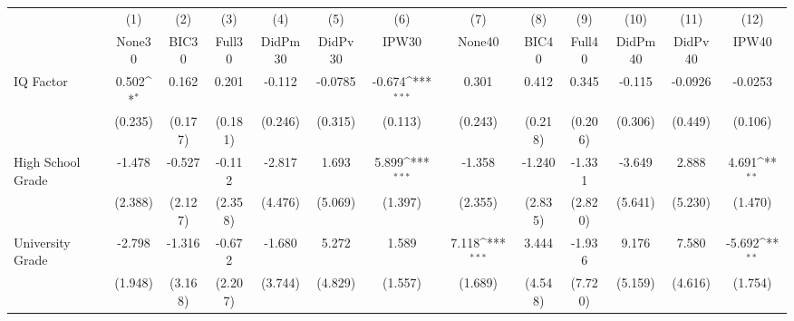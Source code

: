 {
\def\sym#1{\ifmmode^{#1}\else\(^{#1}\)\fi}
\begin{tabular}{l*{12}{c}}
\toprule
            &\multicolumn{1}{c}{(1)}&\multicolumn{1}{c}{(2)}&\multicolumn{1}{c}{(3)}&\multicolumn{1}{c}{(4)}&\multicolumn{1}{c}{(5)}&\multicolumn{1}{c}{(6)}&\multicolumn{1}{c}{(7)}&\multicolumn{1}{c}{(8)}&\multicolumn{1}{c}{(9)}&\multicolumn{1}{c}{(10)}&\multicolumn{1}{c}{(11)}&\multicolumn{1}{c}{(12)}\\
            &\multicolumn{1}{c}{None30}&\multicolumn{1}{c}{BIC30}&\multicolumn{1}{c}{Full30}&\multicolumn{1}{c}{DidPm30}&\multicolumn{1}{c}{DidPv30}&\multicolumn{1}{c}{IPW30}&\multicolumn{1}{c}{None40}&\multicolumn{1}{c}{BIC40}&\multicolumn{1}{c}{Full40}&\multicolumn{1}{c}{DidPm40}&\multicolumn{1}{c}{DidPv40}&\multicolumn{1}{c}{IPW40}\\
\midrule
IQ Factor   &       0.502\sym{*}  &       0.162         &       0.201         &      -0.112         &     -0.0785         &      -0.674\sym{***}&       0.301         &       0.412         &       0.345         &      -0.115         &     -0.0926         &     -0.0253         \\
            &     (0.235)         &     (0.177)         &     (0.181)         &     (0.246)         &     (0.315)         &     (0.113)         &     (0.243)         &     (0.218)         &     (0.206)         &     (0.306)         &     (0.449)         &     (0.106)         \\
\addlinespace
High School Grade&      -1.478         &      -0.527         &      -0.112         &      -2.817         &       1.693         &       5.899\sym{***}&      -1.358         &      -1.240         &      -1.331         &      -3.649         &       2.888         &       4.691\sym{**} \\
            &     (2.388)         &     (2.127)         &     (2.358)         &     (4.476)         &     (5.069)         &     (1.397)         &     (2.355)         &     (2.835)         &     (2.820)         &     (5.641)         &     (5.230)         &     (1.470)         \\
\addlinespace
University Grade&      -2.798         &      -1.316         &      -0.672         &      -1.680         &       5.272         &       1.589         &       7.118\sym{***}&       3.444         &      -1.936         &       9.176         &       7.580         &      -5.692\sym{**} \\
            &     (1.948)         &     (3.168)         &     (2.207)         &     (3.744)         &     (4.829)         &     (1.557)         &     (1.689)         &     (4.548)         &     (7.720)         &     (5.159)         &     (4.616)         &     (1.754)         \\

\end{tabular}}

